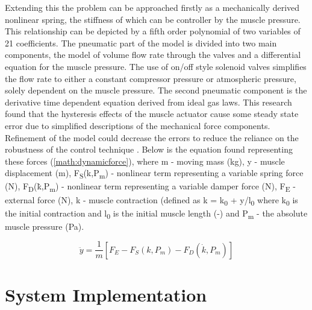 \documentclass[11pt,a4paper]{article}
\begin{document}
Extending this the problem can be approached firstly as a mechanically derived nonlinear spring, the stiffness of which can be controller by the muscle pressure. This relationship can be depicted by a fifth order polynomial of two variables of 21 coefficients. The pneumatic part of the model is divided into two main components, the model of volume flow rate through the valves and a differential equation for the muscle pressure. The use of on/off style solenoid valves simplifies the flow rate to either a constant compressor pressure or atmospheric pressure, solely dependent on the muscle pressure. The second pneumatic component is the derivative time dependent equation derived from ideal gas laws. This research found that the hysteresis effects of the muscle actuator cause some steady state error due to simplified descriptions of the mechanical force components. Refinement of the model could decrease the errors to reduce the reliance on the robustness of the control technique \cite{hosovsky_2012}. Below is the equation found representing these forces (\ref{math:dynamicforce}), where m - moving mass (kg), y - muscle displacement (m), F\textsubscript{S}(k,P\textsubscript{m}) - nonlinear term representing a variable spring force (N), F\textsubscript{D}(\.{k},P\textsubscript{m}) - nonlinear term representing a variable damper force (N), F\textsubscript{E} - external force (N), k - muscle contraction (defined as k = k\textsubscript{0} + y/l\textsubscript{0} where k\textsubscript{0} is the initial contraction and l\textsubscript{0} is the initial muscle length (-) and P\textsubscript{m} - the absolute muscle pressure (Pa).

\begin{equation}
    \ddot{y} = \frac{1}{m}[F_E-F_S(k,P_m)-F_D(\dot{k},P_m)]
    \label{math:dynamicforce}
\end{equation}

\newpage
\section{System Implementation}
\label{sec:system_implementation}

\end{document}
